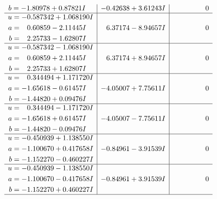 \documentclass[1p]{elsarticle_modified}
\theoremstyle{definition}
\begin{document}
$$\begin{array}{c|c|c}
\begin{aligned}
b &= -1.80978 + 0.87821 I\end{aligned}
 & -0.42638 + 3.61243 I & \phantom{-0.000000 } 0 \\ \hline\begin{aligned}
u &= -0.587342 + 1.068190 I \\
a &= \phantom{-}0.60859 - 2.11445 I \\
b &= \phantom{-}2.25733 - 1.62807 I\end{aligned}
 & \phantom{-}6.37174 - 8.94657 I & \phantom{-0.000000 } 0 \\ \hline\begin{aligned}
u &= -0.587342 - 1.068190 I \\
a &= \phantom{-}0.60859 + 2.11445 I \\
b &= \phantom{-}2.25733 + 1.62807 I\end{aligned}
 & \phantom{-}6.37174 + 8.94657 I & \phantom{-0.000000 } 0 \\ \hline\begin{aligned}
u &= \phantom{-}0.344494 + 1.171720 I \\
a &= -1.65618 - 0.61457 I \\
b &= -1.44820 + 0.09476 I\end{aligned}
 & -4.05007 + 7.75611 I & \phantom{-0.000000 } 0 \\ \hline\begin{aligned}
u &= \phantom{-}0.344494 - 1.171720 I \\
a &= -1.65618 + 0.61457 I \\
b &= -1.44820 - 0.09476 I\end{aligned}
 & -4.05007 - 7.75611 I & \phantom{-0.000000 } 0 \\ \hline\begin{aligned}
u &= -0.450939 + 1.138550 I \\
a &= -1.100670 + 0.417658 I \\
b &= -1.152270 - 0.460227 I\end{aligned}
 & -0.84961 - 3.91539 I & \phantom{-0.000000 } 0 \\ \hline\begin{aligned}
u &= -0.450939 - 1.138550 I \\
a &= -1.100670 - 0.417658 I \\
b &= -1.152270 + 0.460227 I\end{aligned}
 & -0.84961 + 3.91539 I & \phantom{-0.000000 } 0\\
 \hline 
 \end{array}$$\newpage$$\begin{array}{c|c|c}  

\end{array}$$
\end{document}
